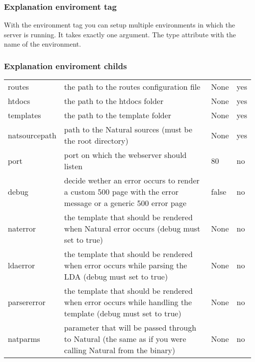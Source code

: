 \documentclass[letterpaper,10pt,english]{sphinxmanual}
\begin{document}
\subsubsection{Explanation enviroment tag}
\label{\detokenize{webserver:explanation-enviroment-tag}}
With the environment tag you can setup multiple environments in which the server is running. It takes exactly one argument. The type attribute with the name of the environment.


\subsubsection{Explanation enviroment childs}
\label{\detokenize{webserver:explanation-enviroment-childs}}
\noindent\begin{tabulary}{\linewidth}{|L|L|L|L|}
\hline
{}\relax &\relax &\relax &\relax \\
\hline
routes
&
the path to the routes configuration file
&
None
&
yes
\\
\hline
htdocs
&
the path to the htdocs folder
&
None
&
yes
\\
\hline
templates
&
the path to the template folder
&
None
&
yes
\\
\hline
natsourcepath
&
path to the Natural sources (must be the root directory)
&
None
&
yes
\\
\hline
port
&
port on which the webserver should listen
&
80
&
no
\\
\hline
debug
&
decide wether an error occurs to render a custom 500 page with the error message or a generic 500 error page
&
false
&
no
\\
\hline
naterror
&
the template that should be rendered when Natural error occurs (debug must set to true)
&
None
&
no
\\
\hline
ldaerror
&
the template that should be rendered when error occurs while parsing the LDA (debug must set to true)
&
None
&
no
\\
\hline
parsererror
&
the template that should be rendered when error occurs while handling the template (debug must set to true)
&
None
&
no
\\
\hline
natparms
&
parameter that will be passed through to Natural (the same as if you were calling Natural from the binary)
&
None
&
no
\\
\hline\end{tabulary}
\end{document}
